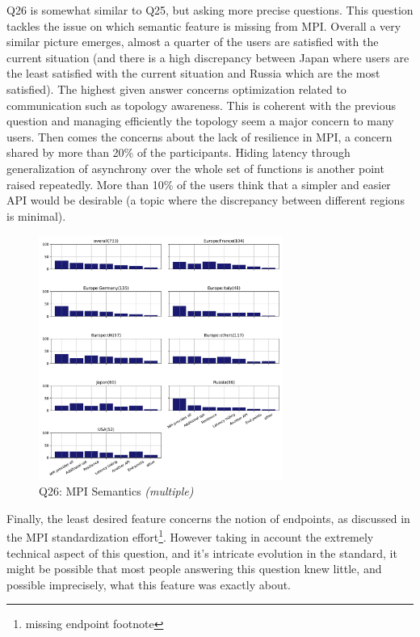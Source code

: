 \documentclass[conference,10pt,letterpaper]{IEEEtran}
\begin{document}
Q26 is somewhat similar to Q25, but asking more precise questions.
This question tackles the issue on which semantic 
feature is missing from MPI. Overall a very similar picture emerges,
almost a quarter of the users are satisfied with the current situation
(and there is a high discrepancy between Japan where users are the least
satisfied with the current situation and Russia which are the most
satisfied). The highest given answer concerns optimization related to
communication such as topology awareness. This is coherent with the
previous question and managing efficiently the topology seem a major
concern to many users. Then comes the concerns about the lack of
resilience in MPI, a concern shared by more than 20\% of the
participants. Hiding latency through generalization of asynchrony over
the 
 whole set of functions is another point raised repeatedly. More than
 10\% of the users think that a simpler and easier API would be
 desirable (a topic where the discrepancy between different regions is
 minimal). 

\begin{figure}[htb]
\begin{center}
\includegraphics[width=8cm]{Figs/Q26.pdf}
\caption{Q26: MPI Semantics {\it(multiple)}}
\label{fig:missing-semantics}
\end{center}
\end{figure}

Finally, the least desired feature concerns the notion of endpoints,
as discussed in the MPI standardization effort\footnote{missing
  endpoint footnote}. However taking in account the extremely
technical aspect of this question, and it's intricate evolution in the
standard, it might be possible that most people answering this
question knew little, and possible imprecisely, what this feature was
exactly about. 
\end{document}
